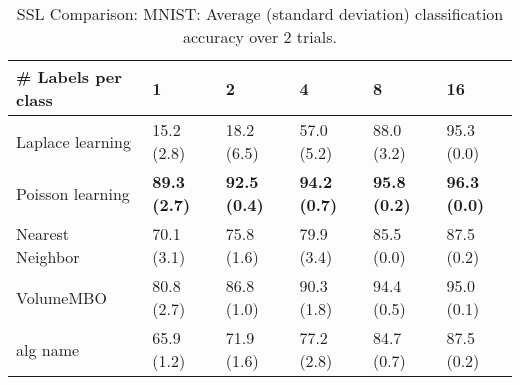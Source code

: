 \documentclass{article}
\begin{document}
\begin{table*}[t!]
\vspace{-3mm}
\caption{SSL Comparison: MNIST: Average (standard deviation) classification accuracy over 2 trials.}
\vspace{-3mm}
\label{tab:SSL Comparison: MNIST}
\vskip 0.15in
\begin{center}
\begin{small}
\begin{sc}
\begin{tabular}{llllll}
\toprule
\# Labels per class&\textbf{1}&\textbf{2}&\textbf{4}&\textbf{8}&\textbf{16}\\
\midrule
Laplace learning&15.2 (2.8)      &18.2 (6.5)      &57.0 (5.2)      &88.0 (3.2)      &95.3 (0.0)      \\
Poisson learning&{\bf 89.3 (2.7)}&{\bf 92.5 (0.4)}&{\bf 94.2 (0.7)}&{\bf 95.8 (0.2)}&{\bf 96.3 (0.0)}\\
Nearest Neighbor&70.1 (3.1)      &75.8 (1.6)      &79.9 (3.4)      &85.5 (0.0)      &87.5 (0.2)      \\
VolumeMBO      &80.8 (2.7)      &86.8 (1.0)      &90.3 (1.8)      &94.4 (0.5)      &95.0 (0.1)      \\
alg name       &65.9 (1.2)      &71.9 (1.6)      &77.2 (2.8)      &84.7 (0.7)      &87.5 (0.2)      \\
\bottomrule
\end{tabular}
\end{sc}
\end{small}
\end{center}
\vskip -0.1in
\end{table*}
\end{document}
